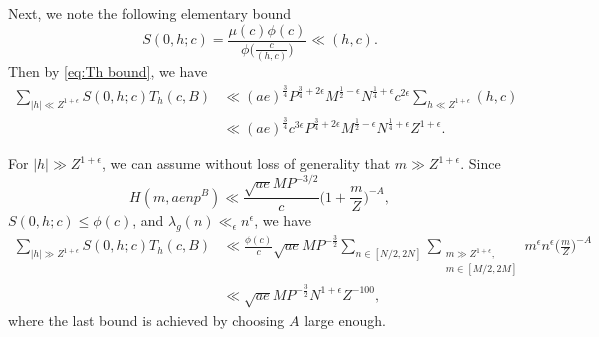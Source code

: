 \documentclass[12pt]{amsart}
\theoremstyle{plain}
\theoremstyle{definition}
\begin{document}
    Next, we note the following elementary bound     \[
    S(0, h; c) = \frac{\mu(c) \phi(c)}{\phi\big(\frac{c}{(h, c)}\big)}
    \ll (h, c) .
    \]
Then by \eqref{eq:Th bound}, we have
    \begin{align}\label{eq:bound h leq Z}
    \sum_{|h|\ll Z^{1+\epsilon}} S(0, h ; c) T_h(c, B)
    &\ll
      (ae)^{\frac34} P^{\frac34+2\epsilon} M^{\frac12-\epsilon}
    N^{\frac14+\epsilon} c^{2\epsilon} 
    \sum_{h\ll Z^{1+\epsilon}} (h, c) \nonumber\\&\ll  (ae)^{\frac34}c^{3\epsilon} 
 P^{\frac34+2\epsilon} M^{\frac12-\epsilon}
    N^{\frac14+\epsilon}Z^{1+\epsilon}  .   \end{align}

For $|h| \gg Z^{1+\epsilon}$, we can assume without loss of generality that $m \gg Z^{1+\epsilon}$. Since
    \[
    H(m, aenp^B)
    \ll \frac{\sqrt{ae}MP^{-3/2}}{c}
    \Big(1+\frac{m}{Z}\Big)^{-A},
    \]
    $S(0, h; c) \leq \phi(c)$, and $\lambda_g(n) \ll_{\epsilon} n^{\epsilon}$, we have 
    \begin{equation}\label{eq:bound h geq Z} 
    \begin{split}
    \sum_{|h| \gg Z^{1+\epsilon}}  S(0, h; c) T_{h}(c, B)
      &\ll \frac{\phi(c)}{c}\sqrt{ae}MP^{-\frac32}
    \sum_{n\in [N/2, 2N]} 
    \sum_{\substack{m \gg Z^{1+\epsilon}, \\ m \in[M/2, 2M]}} m^{\epsilon}  
    n^{\epsilon} 
    \Big(\frac{m}{Z}\Big)^{-A} 
    \\ 
   & \ll  \sqrt{ae}MP^{-\frac32} N^{1+\epsilon}Z^{-100},
    \end{split}
    \end{equation}
    where the last bound is achieved by choosing $A$ large enough.
\end{document}
